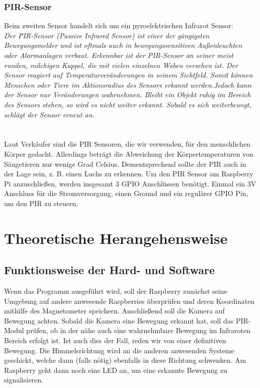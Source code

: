 \documentclass[12pt,a4paper]{scrreprt}
\begin{document}
\subsection{PIR-Sensor}
Beim zweiten Sensor handelt sich um ein pyroelektrischen Infrarot Sensor:\\
\textit{Der PIR-Sensor (Passive Infrared Sensor) ist einer der gängigsten Bewegungsmelder
und ist oftmals auch in bewegungssensitiven Außenleuchten oder Alarmanlagen verbaut.
Erkennbar ist der PIR-Sensor an seiner meist runden, milchigen Kuppel, die mit
vielen einzelnen Waben versehen ist. Der Sensor reagiert auf
Temperaturveränderungen in seinem Sichtfeld. Somit können Menschen oder Tiere
im Aktionsradius des Sensors erkannt werden.Jedoch kann der Sensor nur Veränderungen wahrnehmen. 
Bleibt ein Objekt ruhig im Bereich des Sensors stehen, so wird
es nicht weiter erkannt. Sobald es sich weiterbewegt, schlägt der Sensor erneut an.}\cite[S. 493]{Raspi}\\ \\
\\
Laut Verkäufer sind die PIR Sensoren, die wir verwenden, für den menschlichen Körper gedacht.
Allerdings beträgt die Abweichung der Körpertemperaturen von Säugetieren nur wenige Grad Celsius.
Dementsprechend sollte der PIR auch in der Lage sein, z. B. einen Luchs zu erkennen.
Um den PIR Sensor am Raspberry Pi anzuschließen, werden insgesamt 3 GPIO Anschlüssen benötigt.
Einmal ein 3V Anschluss für die Stromversorgung, einen Ground und ein regulärer GPIO Pin, um den PIR zu steuern.

\chapter{Theoretische Herangehensweise}
\section{Funktionsweise der Hard- und Software}
Wenn das Programm ausgeführt wird, soll der Raspberry zunächst seine Umgebung auf andere anwesende Raspberries überprüfen und deren Koordinaten mithilfe des Magnetometer speichern. Anschließend soll die Kamera auf Bewegung achten. Sobald die Kamera eine Bewegung erkannt hat, soll das PIR-Modul prüfen, ob in der nähe auch eine wahrnehmbare Bewegung im Infraroten Bereich erfolgt ist. Ist auch dies der Fall, reden wir von einer definitiven Bewegung. Die Himmelsrichtung wird an die anderen anwesenden Systeme geschickt, welche dann (falls nötig) ebenfalls in diese Richtung schwenken. Am Raspberry geht dann noch eine LED an, um eine erkannte Bewegung zu signalisieren. 
\end{document}
